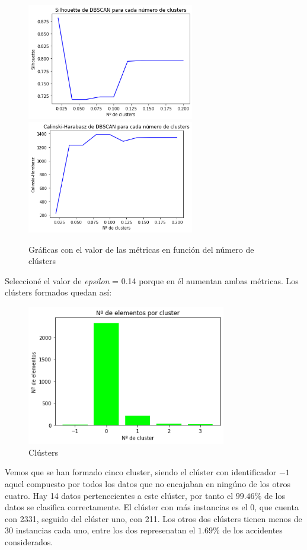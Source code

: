 \documentclass[a4]{article}
\begin{document}
\begin{figure}[H]
  \centering
  \caption{Gráficas con el valor de las métricas en función del número de clústers}
  \includegraphics[width=73mm]{imagenes/c3_dbscan_sil}
  \includegraphics[width=73mm]{imagenes/c3_dbscan_cal}
\end{figure}

Seleccioné el valor de \textit{epsilon} = 0.14 porque en él aumentan ambas métricas. Los clústers formados quedan así:

\begin{figure}[H]
  \centering
  \caption{Clústers}
  \includegraphics[width=87mm]{imagenes/c3_dbscan_clusters}
\end{figure}

Vemos que se han formado cinco cluster, siendo el clúster con identificador $-1$ aquel compuesto por todos los datos que no encajaban en ningúno de los otros cuatro. Hay 14 datos pertenecientes a este clúster, por tanto el $99.46\%$ de los datos se clasifica correctamente. El clúster con más instancias es el 0, que cuenta con 2331, seguido del clúster uno, con 211. Los otros dos clústers tienen menos de 30 instancias cada uno, entre los dos represenatan el $1.69\%$ de los accidentes considerados.
\end{document}
